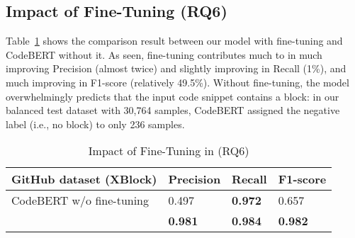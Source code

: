 \subsection{Impact of Fine-Tuning (RQ6)}
\label{sec:rq6}

Table~\ref{tab:codebert} shows the comparison result between
our model with fine-tuning and CodeBERT without it.
%
As seen, fine-tuning contributes much to {\tool} in much improving
Precision (almost twice) and slightly improving in Recall (1\%), and
much improving in F1-score (relatively 49.5\%). Without fine-tuning,
the model
overwhelmingly predicts that the input code snippet contains a
 block: in our balanced test dataset with
30,764 samples, CodeBERT assigned the negative label (i.e., no
 block) to only 236 samples.




\begin{table}[htpb]
  \caption{Impact of Fine-Tuning in {\tool} (RQ6)}
  \vspace{-12pt}
  \small
	\begin{center}
		\renewcommand{\arraystretch}{1}
		\begin{tabular}{| p{3.15cm}<{\centering} | p{1.2cm}<{\centering} | p{1.2cm}<{\centering}| p{1.2cm}<{\centering}|}
		  \hline
			GitHub dataset (XBlock)  & Precision  &  Recall & F1-score \\
			\hline
			CodeBERT w/o fine-tuning & 0.497  & \textbf{0.972}   & 0.657\\
			\hline
			\tool   &  \textbf{0.981} &  {\bf 0.984} & \textbf{0.982}\\
			\hline
		\end{tabular}
		\label{tab:codebert}
	\end{center}
\end{table}
